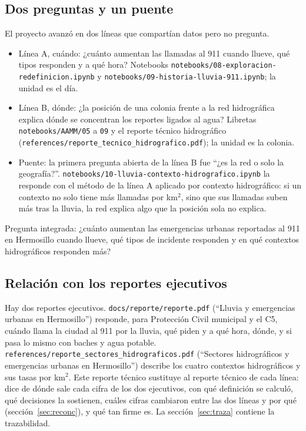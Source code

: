\documentclass[11pt]{article}
\newcommand{\cod}[1]{\nolinkurl{#1}}
\begin{document}
\subsection{Dos preguntas y un puente}

El proyecto avanzó en dos líneas que compartían datos pero no pregunta.

\begin{itemize}
  \item Línea A, cuándo: ¿cuánto aumentan las llamadas al 911 cuando llueve, qué tipos responden y a qué hora? Notebooks \cod{notebooks/08-exploracion-redefinicion.ipynb} y \cod{notebooks/09-historia-lluvia-911.ipynb}; la unidad es el día.
  \item Línea B, dónde: ¿la posición de una colonia frente a la red hidrográfica explica dónde se concentran los reportes ligados al agua? Libretas \cod{notebooks/AAMM/05} a \cod{09} y el reporte técnico hidrográfico (\cod{references/reporte_tecnico_hidrografico.pdf}); la unidad es la colonia.
  \item Puente: la primera pregunta abierta de la línea B fue ``¿es la red o solo la geografía?''. \cod{notebooks/10-lluvia-contexto-hidrografico.ipynb} la responde con el método de la línea A aplicado por contexto hidrográfico: si un contexto no solo tiene más llamadas por km$^2$, sino que sus llamadas suben más tras la lluvia, la red explica algo que la posición sola no explica.
\end{itemize}

Pregunta integrada: ¿cuánto aumentan las emergencias urbanas reportadas al 911 en Hermosillo cuando llueve, qué tipos de incidente responden y en qué contextos hidrográficos responden más?

\subsection{Relación con los reportes ejecutivos}

Hay dos reportes ejecutivos. \cod{docs/reporte/reporte.pdf} (``Lluvia y emergencias urbanas en Hermosillo'') responde, para Protección Civil municipal y el C5, cuándo llama la ciudad al 911 por la lluvia, qué piden y a qué hora, dónde, y si pasa lo mismo con baches y agua potable. \cod{references/reporte_sectores_hidrograficos.pdf} (``Sectores hidrográficos y emergencias urbanas en Hermosillo'') describe los cuatro contextos hidrográficos y sus tasas por km$^2$. Este reporte técnico sustituye al reporte técnico de cada línea: dice de dónde sale cada cifra de los dos ejecutivos, con qué definición se calculó, qué decisiones la sostienen, cuáles cifras cambiaron entre las dos líneas y por qué (sección~\ref{sec:reconc}), y qué tan firme es. La sección~\ref{sec:traza} contiene la trazabilidad.
\end{document}
